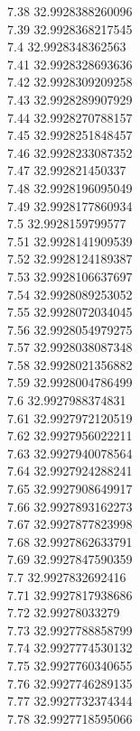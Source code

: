 {7.38	32.9928388260096\\
7.39	32.9928368217545\\
7.4	32.9928348362563\\
7.41	32.9928328693636\\
7.42	32.9928309209258\\
7.43	32.9928289907929\\
7.44	32.9928270788157\\
7.45	32.9928251848457\\
7.46	32.9928233087352\\
7.47	32.992821450337\\
7.48	32.9928196095049\\
7.49	32.9928177860934\\
7.5	32.9928159799577\\
7.51	32.9928141909539\\
7.52	32.9928124189387\\
7.53	32.9928106637697\\
7.54	32.9928089253052\\
7.55	32.9928072034045\\
7.56	32.9928054979275\\
7.57	32.9928038087348\\
7.58	32.9928021356882\\
7.59	32.9928004786499\\
7.6	32.9927988374831\\
7.61	32.9927972120519\\
7.62	32.9927956022211\\
7.63	32.9927940078564\\
7.64	32.9927924288241\\
7.65	32.9927908649917\\
7.66	32.9927893162273\\
7.67	32.9927877823998\\
7.68	32.9927862633791\\
7.69	32.9927847590359\\
7.7	32.9927832692416\\
7.71	32.9927817938686\\
7.72	32.99278033279\\
7.73	32.9927788858799\\
7.74	32.9927774530132\\
7.75	32.9927760340655\\
7.76	32.9927746289135\\
7.77	32.9927732374344\\
7.78	32.9927718595066\\
}
